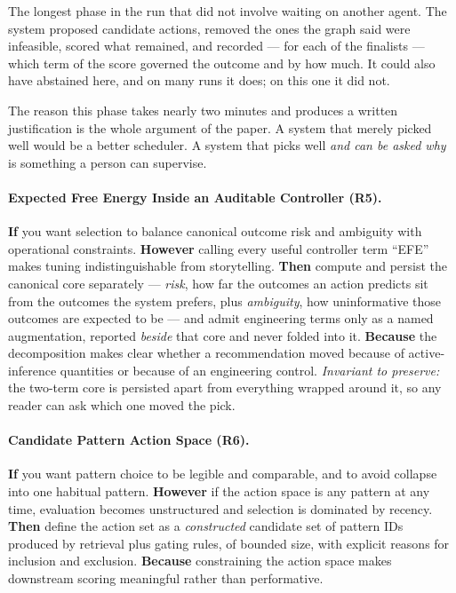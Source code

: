 The longest phase in the run that did not involve waiting on another agent.  The
system proposed candidate actions, removed the ones the graph said were
infeasible, scored what remained, and recorded --- for each of the finalists ---
which term of the score governed the outcome and by how much.  It could also
have abstained here, and on many runs it does; on this one it did not.

The reason this phase takes nearly two minutes and produces a written
justification is the whole argument of the paper.  A system that merely picked
well would be a better scheduler.  A system that picks well \emph{and can be
asked why} is something a person can supervise.

\hypertarget{pat-r5}{}\paragraph{Expected Free Energy Inside an Auditable Controller (R5).}\label{pat:r5} \textbf{If} you want selection to balance canonical outcome risk and ambiguity with operational constraints. \textbf{However} calling every useful controller term ``EFE'' makes tuning indistinguishable from storytelling. \textbf{Then} compute and persist the canonical core separately --- \emph{risk}, how far the outcomes an action predicts sit from the outcomes the system prefers, plus \emph{ambiguity}, how uninformative those outcomes are expected to be --- and admit engineering terms only as a named augmentation, reported \emph{beside} that core and never folded into it. \textbf{Because} the decomposition makes clear whether a recommendation moved because of active-inference quantities or because of an engineering control.  \emph{Invariant to preserve:} the two-term core is persisted apart from everything wrapped around it, so any reader can ask which one moved the pick.

\hypertarget{pat-r6}{}\paragraph{Candidate Pattern Action Space (R6).}\label{pat:r6} \textbf{If} you want pattern choice to be legible and comparable, and to avoid collapse into one habitual pattern. \textbf{However} if the action space is any pattern at any time, evaluation becomes unstructured and selection is dominated by recency. \textbf{Then} define the action set as a \emph{constructed} candidate set of pattern IDs produced by retrieval plus gating rules, of bounded size, with explicit reasons for inclusion and exclusion. \textbf{Because} constraining the action space makes downstream scoring meaningful rather than performative.

